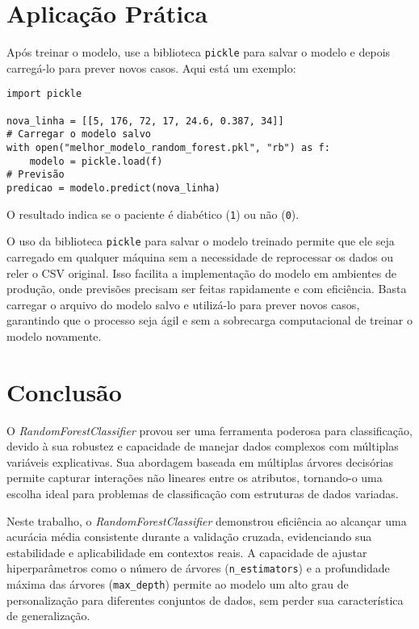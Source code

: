 \documentclass[a4paper,12pt]{article}
\begin{document}
\section{Aplicação Prática}

Após treinar o modelo, use a biblioteca \texttt{pickle} para salvar o modelo e depois carregá-lo para prever novos casos. Aqui está um exemplo:

\begin{verbatim}
import pickle

nova_linha = [[5, 176, 72, 17, 24.6, 0.387, 34]]
# Carregar o modelo salvo
with open("melhor_modelo_random_forest.pkl", "rb") as f:
    modelo = pickle.load(f)
# Previsão
predicao = modelo.predict(nova_linha)
\end{verbatim}

O resultado indica se o paciente é diabético (\texttt{1}) ou não (\texttt{0}).
\vspace{1em}

O uso da biblioteca \texttt{pickle} para salvar o modelo treinado permite que ele seja carregado em qualquer máquina sem a necessidade de reprocessar os dados ou reler o CSV original. Isso facilita a implementação do modelo em ambientes de produção, onde previsões precisam ser feitas rapidamente e com eficiência. Basta carregar o arquivo do modelo salvo e utilizá-lo para prever novos casos, garantindo que o processo seja ágil e sem a sobrecarga computacional de treinar o modelo novamente.


\section{Conclusão}

O \textit{RandomForestClassifier} provou ser uma ferramenta poderosa para classificação, devido à sua robustez e capacidade de manejar dados complexos com múltiplas variáveis explicativas. Sua abordagem baseada em múltiplas árvores decisórias permite capturar interações não lineares entre os atributos, tornando-o uma escolha ideal para problemas de classificação com estruturas de dados variadas.

Neste trabalho, o \textit{RandomForestClassifier} demonstrou eficiência ao alcançar uma acurácia média consistente durante a validação cruzada, evidenciando sua estabilidade e aplicabilidade em contextos reais. A capacidade de ajustar hiperparâmetros como o número de árvores (\texttt{n\_estimators}) e a profundidade máxima das árvores (\texttt{max\_depth}) permite ao modelo um alto grau de personalização para diferentes conjuntos de dados, sem perder sua característica de generalização.
\end{document}
